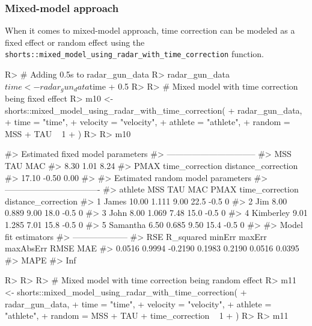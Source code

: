 \documentclass[
]{jss}
\begin{document}
\hypertarget{mixed-model-approach}{%
\subsubsection{Mixed-model approach}\label{mixed-model-approach}}

When it comes to mixed-model approach, time correction can be modeled as a fixed effect or random effect using the \texttt{shorts::mixed\_model\_using\_radar\_with\_time\_correction} function.

\begin{CodeChunk}
\begin{CodeInput}
R> # Adding 0.5s to radar_gun_data
R> radar_gun_data$time <- radar_gun_data$time + 0.5
R> 
R> # Mixed model with time correction being fixed effect
R> m10 <- shorts::mixed_model_using_radar_with_time_correction(
+   radar_gun_data,
+   time = "time",
+   velocity = "velocity",
+   athlete = "athlete",
+   random = MSS + TAU ~ 1
+ )
R> 
R> m10
\end{CodeInput}
\begin{CodeOutput}
#> Estimated fixed model parameters
#> --------------------------------
#>                 MSS                 TAU                 MAC 
#>                8.30                1.01                8.24 
#>                PMAX     time_correction distance_correction 
#>               17.10               -0.50                0.00 
#> 
#> Estimated random model parameters
#> ----------------------------------
#>     athlete   MSS   TAU  MAC PMAX time_correction distance_correction
#> 1     James 10.00 1.111 9.00 22.5            -0.5                   0
#> 2       Jim  8.00 0.889 9.00 18.0            -0.5                   0
#> 3      John  8.00 1.069 7.48 15.0            -0.5                   0
#> 4 Kimberley  9.01 1.285 7.01 15.8            -0.5                   0
#> 5  Samantha  6.50 0.685 9.50 15.4            -0.5                   0
#> 
#> Model fit estimators
#> --------------------
#>       RSE R_squared    minErr    maxErr maxAbsErr      RMSE       MAE 
#>    0.0516    0.9994   -0.2190    0.1983    0.2190    0.0516    0.0395 
#>      MAPE 
#>       Inf
\end{CodeOutput}
\begin{CodeInput}
R> 
R> 
R> # Mixed model with time correction being random effect
R> m11 <- shorts::mixed_model_using_radar_with_time_correction(
+   radar_gun_data,
+   time = "time",
+   velocity = "velocity",
+   athlete = "athlete",
+   random = MSS + TAU + time_correction ~ 1
+ )
R> 
R> m11
\end{CodeInput}

\end{CodeChunk}
\end{document}
